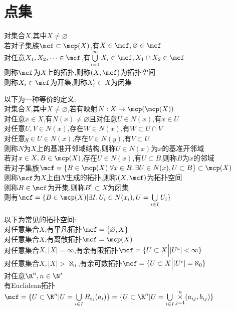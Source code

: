 

%

\setcounter{section}{0}
\setcounter{subsection}{0}

\chapter{点集}

\begin{dingyi}
对集合$X$,其中$X\neq \varnothing$\\
若对子集族$\mcf\subset \mcp(X)$,有$X\in\mcf,\varnothing\in\mcf$\\
对任意$X_1,X_2,\cdots \in \mcf$,有$\bigcup\limits_{i=1}^{\infty}X_i\in\mcf,X_1\cap X_2\in\mcf$\\
则称$\mcf$为$X$上的拓扑,则称$(X,\mcf)$为拓扑空间\\
则称$X_i\in \mcf$为开集,则称$X_i^{c}\subset X$为闭集
\end{dingyi}

\begin{zhu}
以下为一种等价的定义:\\
对集合$X$,其中$X\neq \varnothing$,若有映射$N:X\to \mcp(\mcp(X))$\\
对任意$x\in X$,有$N(x)\neq \varnothing$且对任意$U\in N(x)$,有$x\in U$\\
对任意$U,V\in N(x)$,存在$W\in N(x)$,有$W\subset U\cap V$\\
对任意$y\in U\in N(x)$,存在$V\in N(y)$,有$V\subset U$\\
则称$N$为$X$上的基准开邻域结构,则称$U\in N(x)$为$x$的基准开邻域\\
若对$x\in X,B\in\mcp(X)$,存在$U\in N(x)$,有$U\subset B$,则称$B$为$x$的邻域\\
若对子集族$\mcf=\{B\in \mcp(X)|\forall x\in B,\exists U\in N(x),U\subset B\}\subset \mcp(X)$\\
则称$\mcf$为$X$上由$N$生成的拓扑,则称$(X,\mcf)$为拓扑空间\\
则称$B\in \mcf$为开集,则称$B^{c}\subset X$为闭集\\
则有$\mcf=\{B\in \mcp(X)|\exists I,U_i\in N(x_i),U=\bigcup\limits_{i\in I}U_i\}$
\end{zhu}

\begin{zhu}
以下为常见的拓扑空间:\\
对任意集合$X$,有平凡拓扑$\mcf=\{\varnothing,X\}$\\
对任意集合$X$,有离散拓扑$\mcf=\mcp(X)$\\
对任意集合$X,|X|=\infty$,有余有限拓扑$\mcf=\{U\subset X\Big||U^{c}|<\infty\}$\\
对任意集合$X,|X|>\aleph_0$,有余可数拓扑$\mcf=\{U\subset X\Big||U^{c}|=\aleph_0\}$\\
对任意$\R^n,n\in\N^*$\\
有Euclidean拓扑$\mcf=\{U\subset\R^n|U=\bigcup\limits_{i\in I}B_{\varepsilon_i}(a_i)\}=\{U\subset \R^n|U=\bigcup\limits_{i\in I}\operatorname*{\times}\limits_{j=1}^{n}(a_{ij},b_{ij})\}$
\end{zhu}

